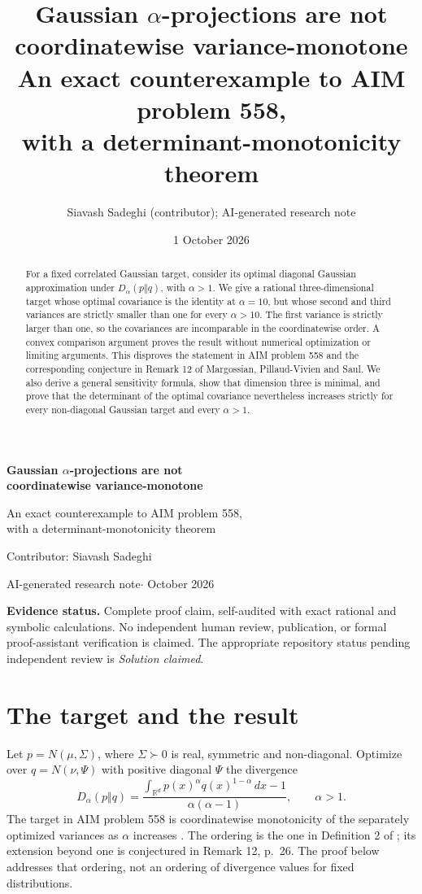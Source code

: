 \documentclass[11pt]{article}
\title{\textbf{Gaussian $\alpha$-projections are not\\coordinatewise variance-monotone}\\[6pt]
\large An exact counterexample to AIM problem 558,\\
with a determinant-monotonicity theorem}
\author{Siavash Sadeghi (contributor); AI-generated research note}
\date{1 October 2026}
\theoremstyle{remark}\newtheorem{remark}[theorem]{Remark}
\newcommand{\R}{\mathbb R}
\begin{document}
\thispagestyle{plain}
\begin{center}
{\Large\bfseries Gaussian $\alpha$-projections are not\\[3pt]
coordinatewise variance-monotone\par}
\vspace{8pt}
{\normalsize An exact counterexample to AIM problem 558,\\
with a determinant-monotonicity theorem\par}
\vspace{10pt}
{\normalsize Contributor: Siavash Sadeghi\par}
\vspace{4pt}
{\small AI-generated research note\quad$\cdot$ October 2026\par}
\end{center}
\vspace{4pt}
\begin{abstract}
For a fixed correlated Gaussian target, consider its optimal diagonal Gaussian approximation under $D_\alpha(p\Vert q)$, with $\alpha>1$. We give a rational three-dimensional target whose optimal covariance is the identity at $\alpha=10$, but whose second and third variances are strictly smaller than one for every $\alpha>10$. The first variance is strictly larger than one, so the covariances are incomparable in the coordinatewise order. A convex comparison argument proves the result without numerical optimization or limiting arguments. This disproves the statement in AIM problem 558 and the corresponding conjecture in Remark 12 of Margossian, Pillaud-Vivien and Saul. We also derive a general sensitivity formula, show that dimension three is minimal, and prove that the determinant of the optimal covariance nevertheless increases strictly for every non-diagonal Gaussian target and every $\alpha>1$.
\end{abstract}
\noindent\textbf{Evidence status.} Complete proof claim, self-audited with exact rational and symbolic calculations. No independent human review, publication, or formal proof-assistant verification is claimed. The appropriate repository status pending independent review is \emph{Solution claimed}.

\section{The target and the result}
Let $p=N(\mu,\Sigma)$, where $\Sigma\succ0$ is real, symmetric and non-diagonal. Optimize over $q=N(\nu,\Psi)$ with positive diagonal $\Psi$ the divergence
\begin{equation}\label{eq:divergence}
D_\alpha(p\Vert q)=\frac{\int_{\R^d}p(x)^\alpha q(x)^{1-\alpha}\,dx-1}{\alpha(\alpha-1)},\qquad \alpha>1.
\end{equation}
The target in AIM problem 558 is coordinatewise monotonicity of the separately optimized variances as $\alpha$ increases \cite{aim}. The ordering is the one in Definition 2 of \cite{mps}; its extension beyond one is conjectured in Remark 12, p.~26. The proof below addresses that ordering, not an ordering of divergence values for fixed distributions.
\end{document}

